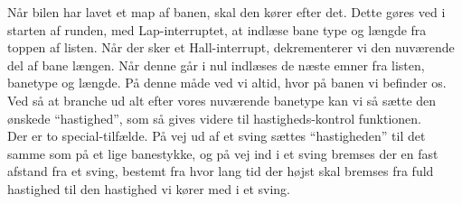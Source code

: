 Når bilen har lavet et map af banen, skal den kører efter det. Dette gøres ved i starten af runden, med Lap-interruptet, at indlæse bane type og længde fra toppen af listen. Når der sker et Hall-interrupt, dekrementerer vi den nuværende del af bane længen. Når denne går i nul indlæses de næste emner fra listen, banetype og længde. På denne måde ved vi altid, hvor på banen vi befinder os.
\\
Ved så at branche ud alt efter vores nuværende banetype kan vi så sætte den ønskede ``hastighed'', som så gives videre til hastigheds-kontrol funktionen.
\\
Der er to special-tilfælde. På vej ud af et sving sættes ``hastigheden'' til det samme som på et lige banestykke, og på vej ind i et sving bremses der en fast afstand fra et sving, bestemt fra hvor lang tid der højst skal bremses fra fuld hastighed til den hastighed vi kører med i et sving.



















